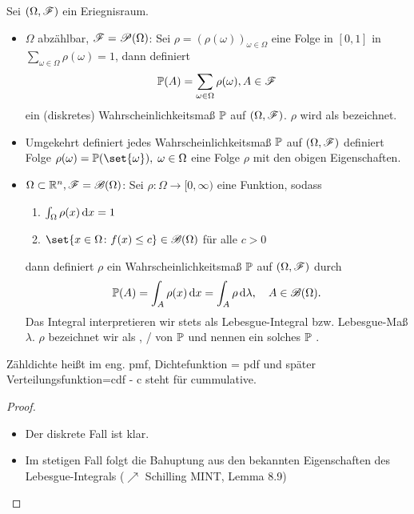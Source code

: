 \begin{proposition}
	Sei $(\Omega, \mathscr{F})$ ein Eriegnisraum.
	\begin{itemize}
		\item $\Omega$ abzählbar, $\mathscr{F} = \mathscr{P}(\Omega)$: Sei $\rho = (\rho(\omega))_{\omega \in \Omega}$ eine Folge in $[0,1]$ in $\sum_{\omega \in \Omega} \rho(\omega) = 1$, dann definiert
		\begin{align}
			\mathbb{P}(A) = \sum_{\omega \in \Omega} \rho(\omega), A \in \mathscr{F} \notag
		\end{align}
		ein (diskretes) Wahrscheinlichkeitsmaß $\mathbb{P}$ auf $(\Omega, \mathscr{F})$. $\rho$ wird als  bezeichnet.
		\item Umgekehrt definiert jedes Wahrscheinlichkeitsmaß $\mathbb{P}$ auf $(\Omega, \mathscr{F})$ definiert Folge $\rho(\omega) = \probp(\set{\omega}),\; \omega \in \Omega$ eine Folge $\rho$ mit den obigen Eigenschaften.
		\item $\Omega \subset \mathbb{R}^n, \mathscr{F} = \mathscr{B}(\Omega)$: Sei $\rho: \Omega \to [0, \infty)$ eine Funktion, sodass
		\begin{enumerate}
			\item $\int_{\Omega} \rho(x)\,\mathrm{d} x = 1$
			\item $\set{x \in \Omega \colon f(x) \le c} \in \borel(\Omega)$ für alle $c > 0$ 
		\end{enumerate}
		dann definiert $\rho$ ein Wahrscheinlichkeitsmaß $\mathbb{P}$ auf $(\Omega, \mathscr{F})$ durch 
		\begin{align}
		\mathbb{P}(A) = \int_{A} \rho(x) \,\mathrm{d} x = \int_{A} \rho \,\mathrm{d} \lambda, \quad A \in \mathscr{B}(\Omega).\notag
		\end{align}
		Das Integral interpretieren wir stets als Lebesgue-Integral bzw. Lebesgue-Maß $\lambda$.
		$\rho$ bezeichnet wir als , / von $\mathbb{P}$ und nennen ein solches $\mathbb{P}$ .
	\end{itemize}
\end{proposition}
\begin{*anmerkung}[English]
Zähldichte heißt im eng. pmf, Dichtefunktion = pdf und später Verteilungsfunktion=cdf - c steht für cummulative.
\end{*anmerkung}

\begin{proof}
	\begin{itemize}
		\item Der diskrete Fall ist klar.
		\item Im stetigen Fall folgt die Bahuptung aus den bekannten Eigenschaften des Lebesgue-Integrals ($\nearrow$ Schilling MINT, Lemma 8.9)
	\end{itemize}
\end{proof}

